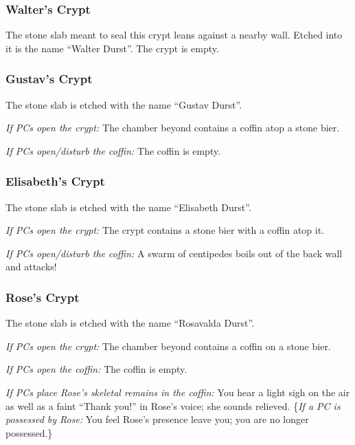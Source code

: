 \subsubsection{Walter's Crypt}
\begin{readout}
  The stone slab meant to seal this crypt leans against a nearby wall. Etched into it is the name
  ``Walter Durst''. The crypt is empty.
\end{readout}

\subsubsection{Gustav's Crypt}
\begin{readout}
  The stone slab is etched with the name ``Gustav Durst''.
  
  \textit{If PCs open the crypt:} The chamber beyond contains a coffin atop a stone bier.
  
  \textit{If PCs open/disturb the coffin:} The coffin is empty.
\end{readout}

\subsubsection{Elisabeth's Crypt}
\begin{readout}
  The stone slab is etched with the name ``Elisabeth Durst''.
  
  \textit{If PCs open the crypt:} The crypt contains a stone bier with a coffin atop it.
  
  \textit{If PCs open/disturb the coffin:} A swarm of centipedes boils out of the back wall and attacks!
\end{readout}

\subsubsection{Rose's Crypt}
\begin{readout}
  The stone slab is etched with the name ``Rosavalda Durst''.
  
  \textit{If PCs open the crypt:} The chamber beyond contains a coffin on a stone bier.
  
  \textit{If PCs open the coffin:} The coffin is empty.
  
  \textit{If PCs place Rose's skeletal remains in the coffin:} You hear a light sigh on the air as well as a
  faint ``Thank you!'' in Rose's voice; she sounds relieved. \{\textit{If a PC is possessed by Rose:} You feel 
  Rose's presence leave you; you are no longer possessed.\}
\end{readout}

